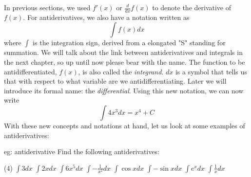 In previous sections, we used $f'(x)$ or $\frac{d}{dx}f(x)$ to denote the derivative of $f(x)$.  For antiderivatives, we also have a notation written as
\[\int f(x) dx\]
where $\int$ is the integration sign, derived from a elongated "S" standing for summation.  We will talk about the link between antiderivatives and integrals in the next chapter, so up until now please bear with the name.  The function to be antidifferentiated, $f(x)$, is also called the \textit{integrand}.  $dx$ is a symbol that tells us that with respect to what variable are we antidifferentiating.  Later we will introduce its formal name: the \textit{differential}.  Using this new notation, we can now write
\[\int 4x^3 dx = x^4 + C\]
With these new concepts and notations at hand, let us look at some examples of antiderivatives:
\begin{eg}[]{eg: antiderivative}
    Find the following antiderivatives:
    \begin{tasks}(4)
        \task $\int 3 dx$
        \task $\int 2x dx$
        \task $\int 6x^5 dx$
        \task $\int -\frac{1}{x^2} dx$
        \task $\int \cos x dx$
        \task $\int -\sin x dx$
        \task $\int e^x dx$
        \task $\int \frac{1}{x} dx$
    \end{tasks}
\end{eg}

